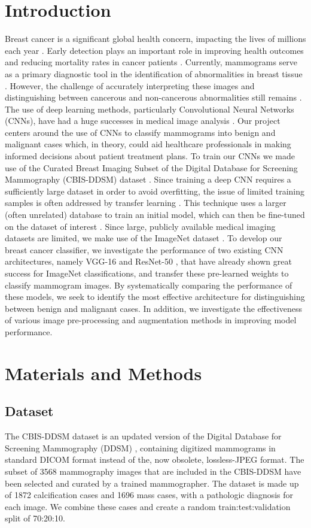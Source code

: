 \documentclass[sn-mathphys,Numbered]{sn-jnl}%
\theoremstyle{thmstyleone}%
\theoremstyle{thmstyletwo}%
\theoremstyle{thmstylethree}%
\begin{document}
\section{Introduction}
\label{Introduction}
Breast cancer is a significant global health concern, impacting the lives of millions each year \cite{siegel2023cancer}. Early detection plays an important role in improving health outcomes and reducing mortality rates in cancer patients \cite{Mathew2018}. Currently, mammograms serve as a primary diagnostic tool in the identification of abnormalities in breast tissue \cite{Mathew2018}. However, the challenge of accurately interpreting these images and distinguishing between cancerous and non-cancerous abnormalities still remains \cite{elter2009}. The use of deep learning methods, particularly Convolutional Neural Networks (CNNs), have had a huge successes in medical image analysis \cite{Cai2020-hn}. Our project centers around the use of CNNs to classify mammograms into benign and malignant cases which, in theory, could aid healthcare professionals in making informed decisions about patient treatment plans. To train our CNNs we made use of the Curated Breast Imaging Subset of the Digital Database for Screening Mammography (CBIS-DDSM) dataset \cite{Lee2017-hi}. Since training a deep CNN requires a sufficiently large dataset in order to avoid overfitting, the issue of limited training samples is often addressed by transfer learning \cite{Kim2022-ge}. This technique uses a larger (often unrelated) database to train an initial model, which can then be fine-tuned on the dataset of interest \cite{Kim2022-ge}. Since large, publicly available medical imaging datasets are limited, we make use of the ImageNet dataset \cite{Deng2009-vj}. To develop our breast cancer classifier, we investigate the performance of two existing CNN architectures, namely VGG-16 \cite{simonyan2015deep} and ResNet-50 \cite{he2015deep}, that have already shown great success for ImageNet classifications, and transfer these pre-learned weights to classify mammogram images. By systematically comparing the performance of these models, we seek to identify the most effective architecture for distinguishing between benign and malignant cases. In addition, we investigate the effectiveness of various image pre-processing and augmentation methods in improving model performance.
\section{Materials and Methods}
\label{Materials}
\subsection{Dataset}
\label{Dataset}
The CBIS-DDSM dataset \cite{Lee2017-hi} is an updated version of the Digital Database for Screening Mammography (DDSM) \cite{Heath2007THEDD}, containing digitized mammograms  in standard DICOM format instead of the, now obsolete, lossless-JPEG format. The subset of 3568 mammography images that are included in the CBIS-DDSM have been selected and curated by a trained mammographer. The dataset is made up of 1872 calcification cases and 1696 mass cases, with a pathologic diagnosis for each image. We combine these cases and create a random train:test:validation split of 70:20:10.
\end{document}
